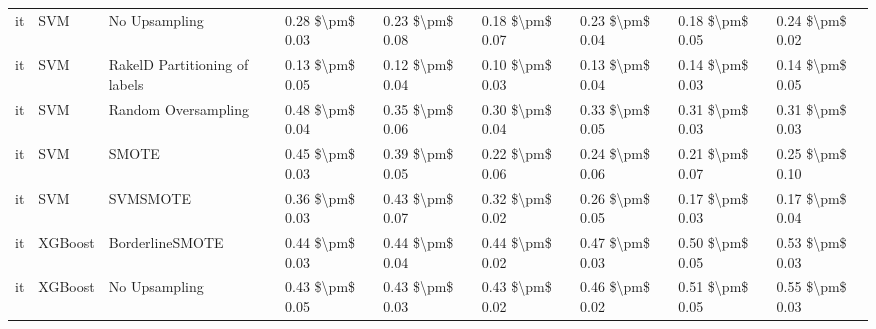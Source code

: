 \begin{tabular}{lllllllll}
      it &                             SVM &                 No Upsampling & 0.28 \$\textbackslash pm\$ 0.03 &           0.23 \$\textbackslash pm\$ 0.08 &       0.18 \$\textbackslash pm\$ 0.07 &        0.23 \$\textbackslash pm\$ 0.04 &                         0.18 \$\textbackslash pm\$ 0.05 &     0.24 \$\textbackslash pm\$ 0.02 \\
      it &                             SVM & RakelD Partitioning of labels & 0.13 \$\textbackslash pm\$ 0.05 &           0.12 \$\textbackslash pm\$ 0.04 &       0.10 \$\textbackslash pm\$ 0.03 &        0.13 \$\textbackslash pm\$ 0.04 &                         0.14 \$\textbackslash pm\$ 0.03 &     0.14 \$\textbackslash pm\$ 0.05 \\
      it &                             SVM &           Random Oversampling & 0.48 \$\textbackslash pm\$ 0.04 &           0.35 \$\textbackslash pm\$ 0.06 &       0.30 \$\textbackslash pm\$ 0.04 &        0.33 \$\textbackslash pm\$ 0.05 &                         0.31 \$\textbackslash pm\$ 0.03 &     0.31 \$\textbackslash pm\$ 0.03 \\
      it &                             SVM &                         SMOTE & 0.45 \$\textbackslash pm\$ 0.03 &           0.39 \$\textbackslash pm\$ 0.05 &       0.22 \$\textbackslash pm\$ 0.06 &        0.24 \$\textbackslash pm\$ 0.06 &                         0.21 \$\textbackslash pm\$ 0.07 &     0.25 \$\textbackslash pm\$ 0.10 \\
      it &                             SVM &                      SVMSMOTE & 0.36 \$\textbackslash pm\$ 0.03 &           0.43 \$\textbackslash pm\$ 0.07 &       0.32 \$\textbackslash pm\$ 0.02 &        0.26 \$\textbackslash pm\$ 0.05 &                         0.17 \$\textbackslash pm\$ 0.03 &     0.17 \$\textbackslash pm\$ 0.04 \\
      it &                         XGBoost &               BorderlineSMOTE & 0.44 \$\textbackslash pm\$ 0.03 &           0.44 \$\textbackslash pm\$ 0.04 &       0.44 \$\textbackslash pm\$ 0.02 &        0.47 \$\textbackslash pm\$ 0.03 &                         0.50 \$\textbackslash pm\$ 0.05 &     0.53 \$\textbackslash pm\$ 0.03 \\
      it &                         XGBoost &                 No Upsampling & 0.43 \$\textbackslash pm\$ 0.05 &           0.43 \$\textbackslash pm\$ 0.03 &       0.43 \$\textbackslash pm\$ 0.02 &        0.46 \$\textbackslash pm\$ 0.02 &                         0.51 \$\textbackslash pm\$ 0.05 &     0.55 \$\textbackslash pm\$ 0.03 \\

\end{tabular}
